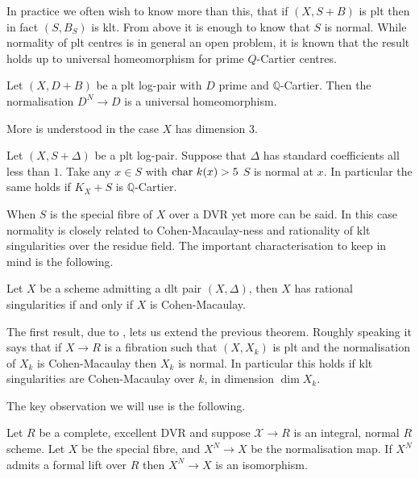 In practice we often wish to know more than this, that if $(X,S+B)$ is plt then in fact $(S,B_{S})$ is klt. From above it is enough to know that $S$ is normal. While normality of plt centres is in general an open problem, it is known that the result holds up to universal homeomorphism for prime $Q$-Cartier centres.

\begin{lemma}\cite[Lemma 2.1]{hacon2020relative}\label{plt-universal}
	
	Let $(X,D+B)$ be a plt log-pair with $D$ prime and $\mathbb{Q}$-Cartier. Then the normalisation $D^{N} \to D$ is a universal homeomorphism.
	
	\end{lemma}

More is understood in the case $X$ has dimension $3$. 

\begin{theorem}\cite[Corollary 7.17]{bhatt2020}\label{plt-adj}
		Let $(X,S+\Delta)$ be a plt log-pair. Suppose that $\Delta$ has standard coefficients all less than $1$. Take any $x \in S$ with $\textup{char } k(x) > 5$ $S$ is normal at $x$. In particular the same holds if $K_{X}+S$ is $\mathbb{Q}$-Cartier.
\end{theorem}

When $S$ is the special fibre of $X$ over a DVR yet more can be said. In this case normality is closely related to Cohen-Macaulay-ness and rationality of klt singularities over the residue field. The important characterisation to keep in mind is the following.

\begin{theorem}\cite[Theorem 1.16]{kovacs2017rational}
	Let $X$ be a scheme admitting a dlt pair $(X,\Delta)$, then $X$ has rational singularities if and only if $X$ is Cohen-Macaulay.
\end{theorem}

The first result, due to \cite{hacon2020relative}, lets us extend the previous theorem. Roughly speaking it says that if $X \to R$ is a fibration such that $(X,X_{k})$ is plt and the normalisation of $X_{k}$ is Cohen-Macaulay then $X_{k}$ is normal. In particular this holds if klt singularities are Cohen-Macaulay over $k$, in dimension $\dim X_{k}$.

The key observation we will use is the following.

\begin{lemma} \label{lift-lemma-1}
	
	Let $R$ be a complete, excellent DVR and suppose $\mathcal{X} \to R$ is an integral, normal $R$ scheme. Let $X$ be the special fibre, and $X^{N} \to X$ be the normalisation map. If $X^{N}$ admits a formal lift over $R$ then $X^{N} \to X$ is an isomorphism.
	
	\end{lemma}

